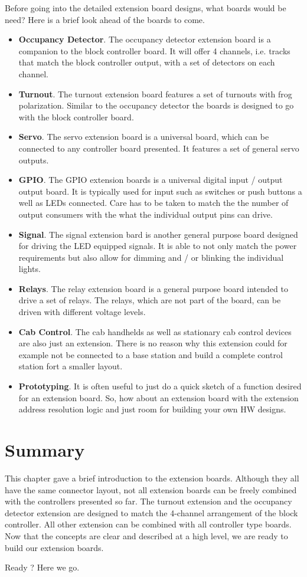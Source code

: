 Before going into the detailed extension board designs, what boards would be need? Here is a brief look ahead of the boards to come.
\begin{itemize}
\item \textbf{Occupancy Detector}. The occupancy detector extension board is a companion to the block controller board. It will offer 4 channels, i.e. tracks that match the block controller output, with a set of detectors on each channel.
\item \textbf{Turnout}. The turnout extension board features a set of turnouts with frog polarization. Similar to the occupancy detector the boards is designed to go with the block controller board.
\item \textbf{Servo}. The servo extension board is a universal board, which can be connected to any controller board presented. It features a set of general servo outputs.
\item \textbf{GPIO}. The GPIO extension boards is a universal digital input / output output board. It is typically used for input such as switches or push buttons a well as LEDs connected. Care has to be taken to match the the number of output consumers with the what the individual output pins can drive.
\item \textbf{Signal}. The signal extension bard is another general purpose board designed for driving the LED equipped signals. It is able to not only match the power requirements but also allow for dimming and / or blinking the individual lights.
\item \textbf{Relays}. The relay extension board is a general purpose board intended to drive a set of relays. The relays, which are not part of the board, can be driven with different voltage levels.
\item \textbf{Cab Control}. The cab handhelds as well as stationary cab control devices are also just an extension. There is no reason why this extension could for example not be connected to a base station and build a complete control station fort a smaller layout.
\item \textbf{Prototyping}. It is often useful to just do a quick sketch of a function desired for an extension board. So, how about an extension board with the extension address resolution logic and just room for building your own HW designs.
\end{itemize}

\section{Summary}

This chapter gave a brief introduction to the extension boards. Although they all have the same connector layout, not all extension boards can be freely combined with the controllers presented so far. The turnout extension and the occupancy detector extension are designed to match the 4-channel arrangement of the block controller. All other extension can be combined with all controller type boards. Now that the concepts are clear and described at a high level, we are ready to build our extension boards.

Ready ? Here we go.